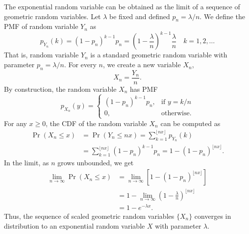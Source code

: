 The exponential random variable can be obtained as the limit of a sequence of geometric random variables.
Let $\lambda$ be fixed and defined $p_n = \lambda/n$.
We define the PMF of random variable $Y_n$ as
\begin{equation*}
p_{Y_n} (k) = (1 - p_n)^{k-1} p_n
= \left( 1 - \frac{\lambda}{n} \right)^{k-1} \frac{\lambda}{n}
\quad k = 1, 2, \ldots
\end{equation*}
That is, random variable $Y_n$ is a standard geometric random variable with parameter $p_n = \lambda/n$.
For every $n$, we create a new variable $X_n$,
\begin{equation*}
X_n = \frac{Y_n}{n}.
\end{equation*}
By construction, the random variable $X_n$ has PMF
\begin{equation*}
p_{X_n} (y) = \left\{ \begin{array}{ll}
(1 - p_n)^{k-1} p_n, & \text{if }y = k/n \\
0, & \text{otherwise} .
\end{array} \right.
\end{equation*}
For any $x \geq 0$, the CDF of the random variable $X_n$ can be computed as
\begin{equation*}
\begin{split}
\Pr (X_n \leq x)
&= \Pr (Y_n \leq n x)
= \sum_{k = 1}^{\lfloor n x \rfloor} p_{Y_n} (k) \\
&= \sum_{k = 1}^{\lfloor n x \rfloor} (1 - p_n)^{k-1} p_n
= 1 - (1 - p_n)^{\lfloor n x \rfloor} .
\end{split}
\end{equation*}
In the limit, as $n$ grows unbounded, we get
\begin{equation*}
\begin{split}
\lim_{n \rightarrow \infty} \Pr (X_n \leq x)
&= \lim_{n \rightarrow \infty} \left[ 1 - (1 - p_n)^{\lfloor n x \rfloor} \right] \\
&= 1 - \lim_{n \rightarrow \infty}
\left( 1 - \frac{\lambda}{n} \right)^{\lfloor n x \rfloor} \\
&= 1 - e^{- \lambda x} .
\end{split}
\end{equation*}
Thus, the sequence of scaled geometric random variables $\{ X_n \}$ converges in distribution to an exponential random variable $X$ with parameter $\lambda$.

